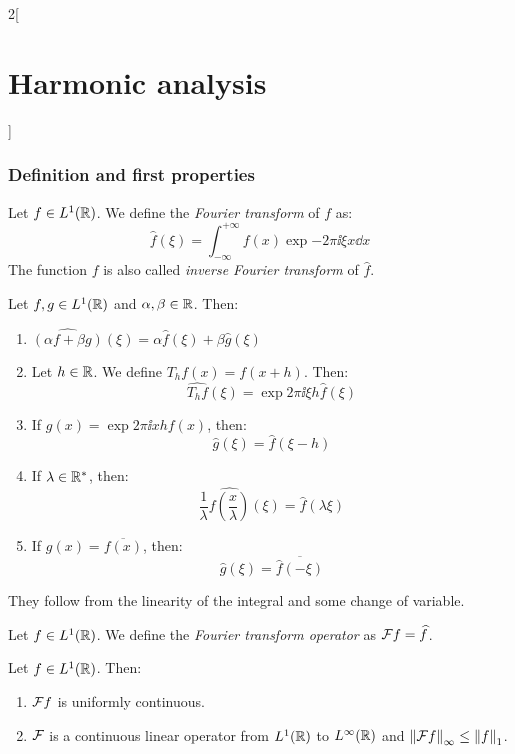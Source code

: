 \documentclass[../../../main_math.tex]{subfiles}
\begin{document}
\begin{multicols}{2}[\section{Harmonic analysis}]
  \subsubsection{Definition and first properties}
  \begin{definition}
    Let $f\in L^1(\mathbb{R})$. We define the \emph{Fourier transform} of $f$ as:
    $$\widehat{f}(\xi)=\int_{-\infty}^{+\infty}f(x)\exp{-2\pi \ii\xi x}\dd{x}$$
    The function $f$ is also called \emph{inverse Fourier transform} of $\widehat{f}$.
  \end{definition}
  \begin{proposition}\label{HA:fourierTransProperties}
    Let $f,g\in L^1(\mathbb{R})$ and $\alpha,\beta\in\mathbb{R}$. Then:
    \begin{enumerate}
      \item $\widehat{(\alpha f+\beta g)}(\xi)=\alpha\widehat{f}(\xi)+\beta \widehat{g}(\xi)$
            \item\label{HA:FTprop2} Let $h\in\mathbb{R}$. We define $T_hf(x)=f(x+h)$. Then: $$\widehat{T_hf}(\xi)=\exp{2\pi\ii \xi h}\widehat{f}(\xi)$$
            \item\label{HA:FTprop3} If $g(x)=\exp{2\pi\ii x h}f(x)$, then: $$\widehat{g}(\xi)=\widehat{f}(\xi-h)$$
            \item\label{HA:FTprop4} If $\lambda\in\mathbb{R}^*$, then: $$\frac{1}{\lambda}\widehat{f\left(\frac{x}{\lambda}\right)}(\xi)=\widehat{f}(\lambda\xi)$$
            \item\label{HA:FTprop5} If $g(x)=\overline{f(x)}$, then: $$\widehat{g}(\xi)=\overline{\widehat{f}(-\xi)}$$
    \end{enumerate}
  \end{proposition}
  \begin{sproof}
    They follow from the linearity of the integral and some change of variable.
  \end{sproof}
  \begin{definition}
    Let $f\in L^1(\mathbb{R})$. We define the \emph{Fourier transform operator} as $\mathcal{F} f=\widehat{f}$.
  \end{definition}
  \begin{proposition}\label{HA:boundedFT}
    Let $f\in L^1(\mathbb{R})$. Then:
    \begin{enumerate}
      \item $\mathcal{F} f$ is uniformly continuous.
      \item $\mathcal{F}$ is a continuous linear operator from $L^1(\mathbb{R})$ to $L^\infty(\mathbb{R})$ and $\left\|\mathcal{F} f\right\|_{\infty}\leq \left\|f\right\|_1$.
    \end{enumerate}

\end{proposition}
\end{multicols}
\end{document}
